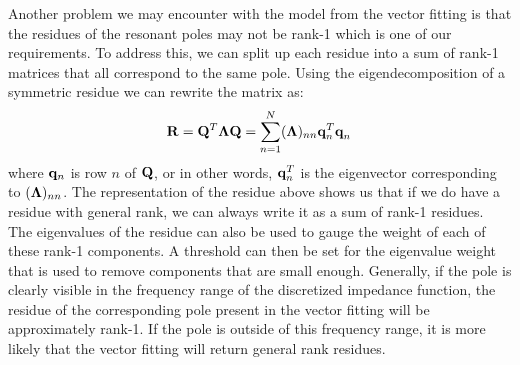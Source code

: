 Another problem we may encounter with the model from the vector fitting is that the residues of the resonant poles may not be rank-1 which is one of our requirements. To address this, we can split up each residue into a sum of rank-1 matrices that all correspond to the same pole. Using the eigendecomposition of a symmetric residue we can rewrite the matrix as:
\begin{equation}
    \vb{R} = \vb{Q}^T \vb{\Lambda} \vb{Q} = \sum_{n=1}^N (\vb{\Lambda})_{nn} \vb{q}^T_n \vb{q}^{\phantom{T}}_n
\end{equation}
where $\vb{q}_n$ is row $n$ of $\vb{Q}$, or in other words, $\vb{q}^T_n$ is the eigenvector corresponding to $(\vb{\Lambda})_{nn}$. The representation of the residue above shows us that if we do have a residue with general rank, we can always write it as a sum of rank-1 residues. The eigenvalues of the residue can also be used to gauge the weight of each of these rank-1 components. A threshold can then be set for the eigenvalue weight that is used to remove components that are small enough. Generally, if the pole is clearly visible in the frequency range of the discretized impedance function, the residue of the corresponding pole present in the vector fitting will be approximately rank-1. If the pole is outside of this frequency range, it is more likely that the vector fitting will return general rank residues.

